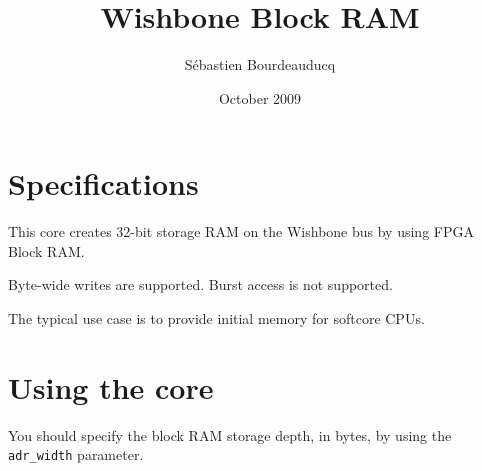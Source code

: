 \documentclass[a4paper,11pt]{article}
\title{Wishbone Block RAM}
\author{S\'ebastien Bourdeauducq}
\date{October 2009}
\begin{document}
\setlength{\parindent}{0pt}
\setlength{\parskip}{5pt}
\maketitle{}
\section{Specifications}
This core creates 32-bit storage RAM on the Wishbone bus by using FPGA Block RAM.

Byte-wide writes are supported. Burst access is not supported.

The typical use case is to provide initial memory for softcore CPUs.

\section{Using the core}
You should specify the block RAM storage depth, in bytes, by using the \verb!adr_width! parameter.
\end{document}
